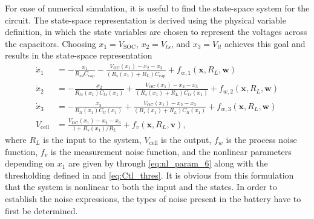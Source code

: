 \documentclass[../zhang_thesis.tex]{subfiles}
\begin{document}
For ease of numerical simulation, it is useful to find the state-space system for the circuit. The state-space representation is derived using the physical variable definition, in which the state variables are chosen to represent the voltages across the capacitors. Choosing $x_1=V_\text{SOC}$, $x_2=V_{ts}$, and $x_3=V_{tl}$ achieves this goal and results in the state-space representation
\begin{align}
    \dot{x}_1 &= - \frac{x_1}{R_{sd}C_\text{cap}} - \frac{V_\text{OC}(x_1)-x_2-x_3}{(R_s(x_1)+R_L)C_\text{cap}} + f_{w,1}(\mathbf{x},R_L,\mathbf{w}) \\
    \dot{x}_2 &= - \frac{x_2}{R_{ts}(x_1)C_{ts}(x_1)} + \frac{V_\text{OC}(x_1) - x_2 - x_3}{(R_s(x_1)+R_L)C_{ts}(x_1)} + f_{w,2}(\mathbf{x},R_L,\mathbf{w}) \\
    \dot{x}_3 &= - \frac{x_3}{R_{tl}(x_1)C_{tl}(x_1)} + \frac{V_\text{OC}(x_1) - x_2 - x_3}{(R_s(x_1)+R_L)C_{tl}(x_1)} + f_{w,3}(\mathbf{x},R_L,\mathbf{w}) \\
    V_\text{cell} &= \frac{V_\text{OC}(x_1) - x_2 - x_3}{1+R_s(x_1)/R_L} + f_v(\mathbf{x},R_L,\mathbf{v}),
\end{align}
where $R_L$ is the input to the system, $V_\text{cell}$ is the output, $f_w$ is the process noise function, $f_v$ is the measurement noise function, and the nonlinear parameters depending on $x_1$ are given by  through \ref{eq:nl_param_6} along with the thresholding defined in  and \ref{eq:Ctl_thres}. It is obvious from this formulation that the system is nonlinear to both the input and the states. In order to establish the noise expressions, the types of
noise present in the battery have to first be determined.
\end{document}
